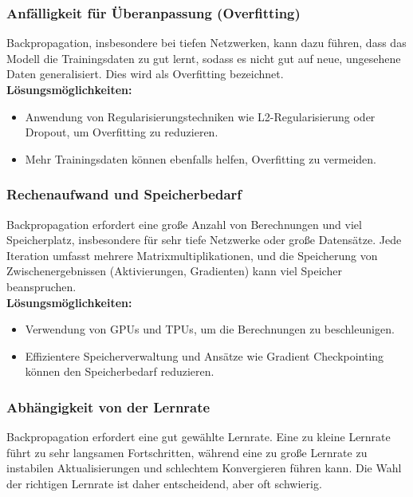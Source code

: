 \documentclass[12pt]{article}
\begin{document}
\subsubsection{Anfälligkeit für Überanpassung (Overfitting)}

Backpropagation, insbesondere bei tiefen Netzwerken, kann dazu führen, dass das Modell die Trainingsdaten zu gut lernt, sodass es nicht gut auf neue, ungesehene Daten generalisiert. Dies wird als Overfitting bezeichnet.\\

\textbf{Lösungsmöglichkeiten:}
\begin{itemize}
    \item Anwendung von Regularisierungstechniken wie L2-Regularisierung oder Dropout, um Overfitting zu reduzieren.
    \item Mehr Trainingsdaten können ebenfalls helfen, Overfitting zu vermeiden.
\end{itemize}
%
\subsubsection{Rechenaufwand und Speicherbedarf}

Backpropagation erfordert eine große Anzahl von Berechnungen und viel Speicherplatz, insbesondere für sehr tiefe Netzwerke oder große Datensätze. Jede Iteration umfasst mehrere Matrixmultiplikationen, und die Speicherung von Zwischenergebnissen (Aktivierungen, Gradienten) kann viel Speicher beanspruchen.\\

\textbf{Lösungsmöglichkeiten:}
\begin{itemize}
    \item Verwendung von GPUs und TPUs, um die Berechnungen zu beschleunigen.
    \item Effizientere Speicherverwaltung und Ansätze wie Gradient Checkpointing können den Speicherbedarf reduzieren.
\end{itemize}
%
\subsubsection{Abhängigkeit von der Lernrate}

Backpropagation erfordert eine gut gewählte Lernrate. Eine zu kleine Lernrate führt zu sehr langsamen Fortschritten, während eine zu große Lernrate zu instabilen Aktualisierungen und schlechtem Konvergieren führen kann. Die Wahl der richtigen Lernrate ist daher entscheidend, aber oft schwierig.\\
\end{document}
